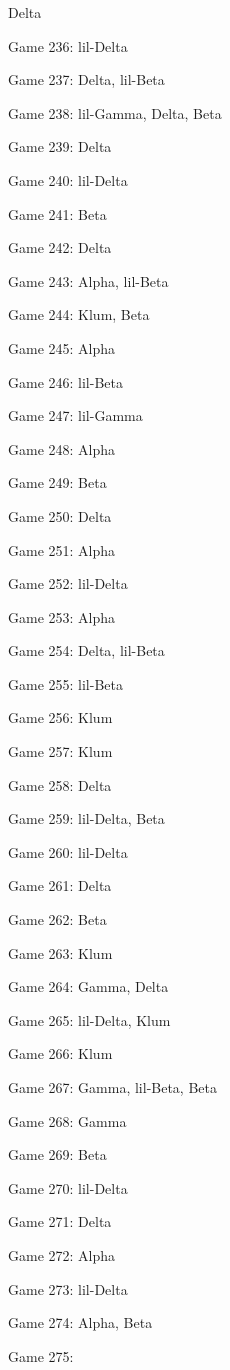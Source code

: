 \documentclass{article}
\begin{document}
\begin{multicols}{3}
\begin{compactitem}
Delta
\item Game 236:
lil-Delta
\item Game 237:
Delta, lil-Beta
\item Game 238:
lil-Gamma, Delta, Beta
\item Game 239:
Delta
\item Game 240:
lil-Delta
\item Game 241:
Beta
\item Game 242:
Delta
\item Game 243:
Alpha, lil-Beta
\item Game 244:
Klum, Beta
\item Game 245:
Alpha
\item Game 246:
lil-Beta
\item Game 247:
lil-Gamma
\item Game 248:
Alpha
\item Game 249:
Beta
\item Game 250:
Delta
\item Game 251:
Alpha
\item Game 252:
lil-Delta
\item Game 253:
Alpha
\item Game 254:
Delta, lil-Beta
\item Game 255:
lil-Beta
\item Game 256:
Klum
\item Game 257:
Klum
\item Game 258:
Delta
\item Game 259:
lil-Delta, Beta
\item Game 260:
lil-Delta
\item Game 261:
Delta
\item Game 262:
Beta
\item Game 263:
Klum
\item Game 264:
Gamma, Delta
\item Game 265:
lil-Delta, Klum
\item Game 266:
Klum
\item Game 267:
Gamma, lil-Beta, Beta
\item Game 268:
Gamma
\item Game 269:
Beta
\item Game 270:
lil-Delta
\item Game 271:
Delta
\item Game 272:
Alpha
\item Game 273:
lil-Delta
\item Game 274:
Alpha, Beta
\item Game 275:

\end{compactitem}
\end{multicols}
\end{document}
